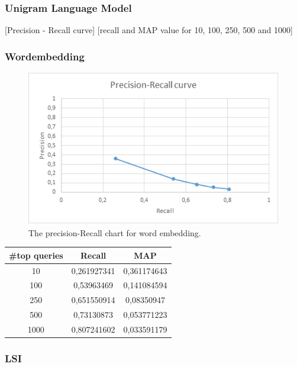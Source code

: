 \subsubsection{Unigram Language Model}
[Precision - Recall curve]
[recall and MAP value for 10, 100, 250, 500 and 1000]

\subsubsection{Wordembedding}
\begin{figure}[H]
	\centering
	\includegraphics[width=130mm]{images/precision-recall_embedding.png}
	\caption{The precision-Recall chart for word embedding.}
	\label{fig:embeddingpresicionrecall}
\end{figure}

\begin{table}[H]
	\centering
    \begin{tabular}{| c | c | c |}
        \hline
        \textbf{\#top queries} & \textbf{Recall} & \textbf{MAP}\\ \hline
        10   & 0,261927341  & 0,361174643 \\
        100  & 0,53963469   & 0,141084594 \\
        250  & 0,651550914  & 0,08350947  \\
        500  & 0,73130873   & 0,053771223 \\
        1000 & 0,807241602  & 0,033591179 \\
        \hline
    \end{tabular}
\end{table}

\subsubsection{LSI}
